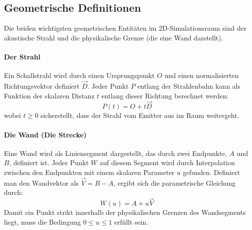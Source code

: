 \documentclass{article}
\begin{document}
    \subsection{Geometrische Definitionen}\label{subsec:geometric-definitions}

    Die beiden wichtigsten geometrischen Entitäten im 2D-Simulationsraum sind der akustische Strahl und die physikalische Grenze (die eine Wand darstellt).

    \paragraph{Der Strahl}
    Ein Schallstrahl wird durch einen Ursprungspunkt $O$ und einen normalisierten Richtungsvektor definiert $\vec{D}$.
    Jeder Punkt $P$ entlang der Strahlenbahn kann als Funktion der skalaren Distanz $t$ entlang dieser Richtung berechnet werden:
    \[P(t) = O + t\vec{D}\]
    wobei $t \ge 0$ sicherstellt, dass der Strahl vom Emitter aus im Raum weitergeht.

    \paragraph{Die Wand (Die Strecke)}

    Eine Wand wird als Liniensegment dargestellt, das durch zwei Endpunkte, $A$ und $B$, definiert ist.
    Jeder Punkt $W$ auf diesem Segment wird durch Interpolation zwischen den Endpunkten mit einem skalaren Parameter $u$ gefunden.
    Definiert man den Wandvektor als $\vec{V} = B - A$, ergibt sich die parametrische Gleichung durch:
    \[W(u) = A + u\vec{V}\]
    Damit ein Punkt strikt innerhalb der physikalischen Grenzen des Wandsegments liegt, muss die Bedingung $0 \le u \le 1$ erfüllt sein.
\end{document}
